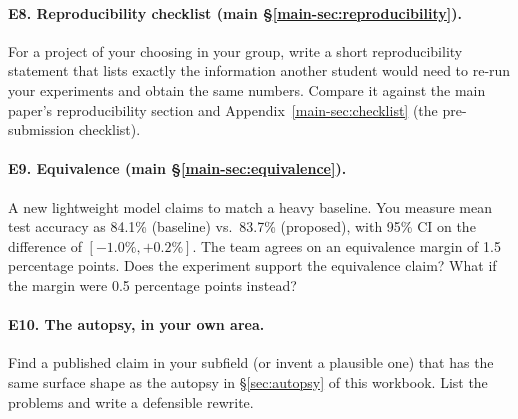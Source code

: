 \documentclass[11pt]{article}
\begin{document}
\paragraph{E8. Reproducibility checklist (main \S\ref{main-sec:reproducibility}).} For a project of your choosing
in your group, write a short reproducibility statement that lists exactly
the information another student would need to re-run your experiments and
obtain the same numbers. Compare it against the main paper's
reproducibility section and Appendix~\ref{main-sec:checklist} (the
pre-submission checklist).

\paragraph{E9. Equivalence (main \S\ref{main-sec:equivalence}).} A new lightweight model claims to
match a heavy baseline. You measure mean test accuracy as 84.1\%
(baseline) vs.\ 83.7\% (proposed), with 95\% CI on the difference of
$[-1.0\%, +0.2\%]$. The team agrees on an equivalence margin of 1.5
percentage points. Does the experiment support the equivalence claim?
What if the margin were 0.5 percentage points instead?

\paragraph{E10. The autopsy, in your own area.} Find a published claim
in your subfield (or invent a plausible one) that has the same surface
shape as the autopsy in \S\ref{sec:autopsy} of this workbook. List the
problems and write a defensible rewrite.
\end{document}
